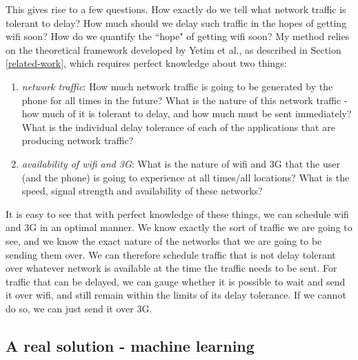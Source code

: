 \documentclass[12pt, fleqn]{article}
\begin{document}
This gives rise to a few questions. How exactly do we tell what network traffic is tolerant to 
delay? How much should we delay such traffic in the hopes of getting wifi soon?
How do we quantify the ``hope" of getting wifi soon? My method relies on the 
theoretical framework developed by Yetim et al., as described in Section 
\ref{related-work}, which requires perfect knowledge about two things:\cite{yetim-2012} 
\begin{enumerate}
  \item \emph{network traffic}: How much network traffic is going to be 
  generated by the phone for all times in the future? What is the nature of this 
  network traffic - how much of it is tolerant to delay, and how much must be 
  sent immediately? What is the individual delay tolerance of each of the 
  applications that are producing network traffic?
  \item \emph{availability of wifi and 3G}: What is the nature of wifi and 3G 
  that the user (and the phone) is going to experience at all times/all 
  locations? What is the speed, signal strength and availability of these 
  networks?
\end{enumerate}
It is easy to see that with perfect knowledge of these things, we can schedule 
wifi and 3G in an optimal manner. We know exactly the sort of traffic we are
going to see, and we know the exact nature of the networks that we are going to 
be sending them over. We can therefore schedule traffic that is not delay 
tolerant over whatever network is available at the time the traffic needs to be 
sent. For traffic that can be delayed, we can gauge whether it is possible to 
wait and send it over wifi, and still remain within the limits of its delay 
tolerance. If we cannot do so, we can just send it over 3G. 

\subsection{A real solution - machine learning}
\end{document}
